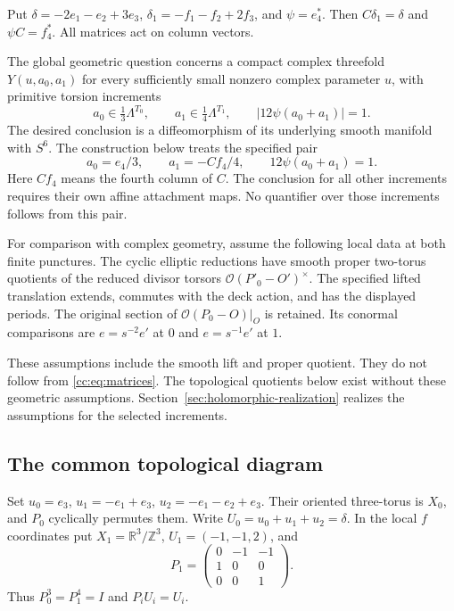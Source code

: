 Put $\delta=-2e_1-e_2+3e_3$, $\delta_1=-f_1-f_2+2f_3$, and
$\psi=e_4^*$. Then $C\delta_1=\delta$ and $\psi C=f_4^*$.
All matrices act on column vectors.

The global geometric question concerns a compact complex threefold
$Y(u,a_0,a_1)$ for every sufficiently small nonzero complex parameter $u$,
with primitive torsion increments
\[
a_0\in\tfrac13\Lambda^{T_0},\qquad
a_1\in\tfrac14\Lambda^{T_1},\qquad
|12\psi(a_0+a_1)|=1.
\]
The desired conclusion is a diffeomorphism of its underlying smooth
manifold with $S^6$. The construction below treats the specified pair
\begin{equation}\label{cc:eq:increments}
a_0=e_4/3,\qquad a_1=-Cf_4/4,
\qquad 12\psi(a_0+a_1)=1.
\end{equation}
Here $Cf_4$ means the fourth column of $C$.
The conclusion for all other increments requires their own affine
attachment maps. No quantifier over those increments follows from this pair.

For comparison with complex geometry, assume the following local data at
both finite punctures. The cyclic elliptic reductions have smooth
proper two-torus quotients of the reduced divisor torsors
$\mathcal O(P'_0-O')^\times$. The specified lifted translation extends,
commutes with the deck action, and has the displayed periods.
The original section of $\mathcal O(P_0-O)|_O$ is retained.
Its conormal comparisons are $e=s^{-2}e'$ at $0$ and $e=s^{-1}e'$ at $1$.

These assumptions include the smooth lift and proper quotient.
They do not follow from \eqref{cc:eq:matrices}.
The topological quotients below exist without these geometric assumptions.
Section~\ref{sec:holomorphic-realization} realizes the assumptions
for the selected increments.

\subsection{The common topological diagram}

Set $u_0=e_3$, $u_1=-e_1+e_3$, $u_2=-e_1-e_2+e_3$.
Their oriented three-torus is $X_0$, and $P_0$ cyclically permutes them.
Write $U_0=u_0+u_1+u_2=\delta$.
In the local $f$ coordinates put $X_1=\mathbb R^3/\mathbb Z^3$,
$U_1=(-1,-1,2)$, and
\[
P_1=\begin{pmatrix}0&-1&-1\\1&0&0\\0&0&1\end{pmatrix}.
\]
Thus $P_0^3=P_1^4=I$ and $P_iU_i=U_i$.


